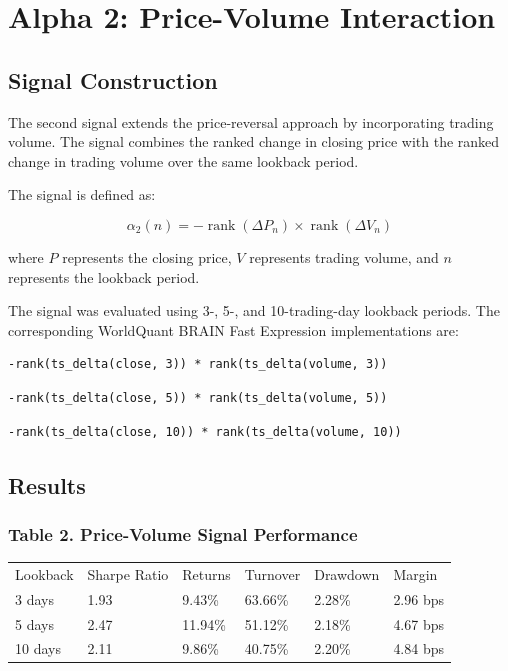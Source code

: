 \documentclass{article}
\begin{document}
\section{Alpha 2: Price-Volume Interaction}

\subsection{Signal Construction}

The second signal extends the price-reversal approach by incorporating trading volume. The signal combines the ranked change in closing price with the ranked change in trading volume over the same lookback period.

The signal is defined as:

\begin{equation}
\alpha_2(n) =
-\operatorname{rank}\left(\Delta P_n\right)
\times
\operatorname{rank}\left(\Delta V_n\right)
\end{equation}

where \(P\) represents the closing price, \(V\) represents trading volume, and \(n\) represents the lookback period.

The signal was evaluated using 3-, 5-, and 10-trading-day lookback periods. The corresponding WorldQuant BRAIN Fast Expression implementations are:

\begin{verbatim}
-rank(ts_delta(close, 3)) * rank(ts_delta(volume, 3))
\end{verbatim}

\begin{verbatim}
-rank(ts_delta(close, 5)) * rank(ts_delta(volume, 5))
\end{verbatim}

\begin{verbatim}
-rank(ts_delta(close, 10)) * rank(ts_delta(volume, 10))
\end{verbatim}

\subsection{Results}

\subsubsection{Table 2. Price-Volume Signal Performance}

\begin{table}
\centering

\begin{tabular}{l l l l l l}
Lookback & Sharpe Ratio & Returns & Turnover & Drawdown & Margin \\

3 days & 1.93 & 9.43\% & 63.66\% & 2.28\% & 2.96 bps \\
5 days & 2.47 & 11.94\% & 51.12\% & 2.18\% & 4.67 bps \\
10 days & 2.11 & 9.86\% & 40.75\% & 2.20\% & 4.84 bps \\

\end{tabular}

\end{table}
\end{document}
